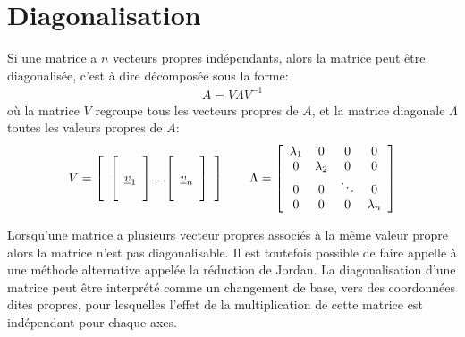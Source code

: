 \section{Diagonalisation}

Si une matrice a $n$ vecteurs propres indépendants, alors la matrice peut être diagonalisée, c'est à dire décomposée sous la forme:
\begin{align}
A = V \Lambda V^{-1}
\label{eq:diagmatrix}
\end{align}
où la matrice $V$ regroupe tous les vecteurs propres de $A$, et la matrice diagonale $\Lambda$ toutes les valeurs propres  de $A$:
\begin{align}
V = 
\left[ \begin{array}{c@{}c@{}c}  
\left[  \begin{array}{c}  \\ \underline{v}_1 \\ \\ \end{array} \right] &  \ldots & \left[  \begin{array}{c} \\ \underline{v}_n \\ \\ \end{array} \right]
\end{array} \right]
\quad \quad
\Lambda = 
\left[ \begin{array}{c c c c}  
\lambda_1 &  0          & 0 & 0 \\
0         &  \lambda_2  & 0      & 0 \\
0         &  0          &\ddots  & 0 \\
0         &  0          & 0  & \lambda_n
\end{array} \right]
\end{align}

Lorsqu'une matrice a plusieurs vecteur propres associés à la même valeur propre alors la matrice n'est pas diagonalisable. Il est toutefois possible de faire appelle à une méthode alternative appelée la réduction de Jordan. 
%
La diagonalisation d'une matrice peut être interprété comme un changement de base, vers des coordonnées dites propres, pour lesquelles l'effet de la multiplication de cette matrice est indépendant pour chaque axes. 


